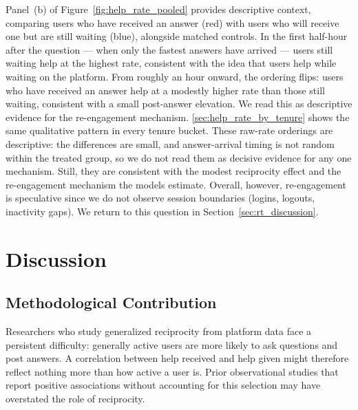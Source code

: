 Panel~(b) of Figure~\ref{fig:help_rate_pooled} provides descriptive context, comparing users who have received an answer (red) with users who will receive one but are still waiting (blue), alongside matched controls. In the first half-hour after the question --- when only the fastest answers have arrived --- users still waiting help at the highest rate, consistent with the idea that users help while waiting on the platform. From roughly an hour onward, the ordering flips: users who have received an answer help at a modestly higher rate than those still waiting, consistent with a small post-answer elevation. We read this as descriptive evidence for the re-engagement mechanism. \ref{sec:help_rate_by_tenure} shows the same qualitative pattern in every tenure bucket. These raw-rate orderings are descriptive: the differences are small, and answer-arrival timing is not random within the treated group, so we do not read them as decisive evidence for any one mechanism. Still, they are consistent with the modest reciprocity effect and the re-engagement mechanism the models estimate. Overall, however, re-engagement is speculative since we do not observe session boundaries (logins, logouts, inactivity gaps). We return to this question in Section~\ref{sec:rt_discussion}.

\section{Discussion}
\label{sec:discussion}

\subsection{Methodological Contribution}

Researchers who study generalized reciprocity from platform data face a persistent difficulty: generally active users are more likely to ask questions and post answers. A correlation between help received and help given might therefore reflect nothing more than how active a user is. Prior observational studies that report positive associations without accounting for this selection \citep{baker_paying_2014, chen_engaging_2018, joyce_predicting_2006} may have overstated the role of reciprocity.

